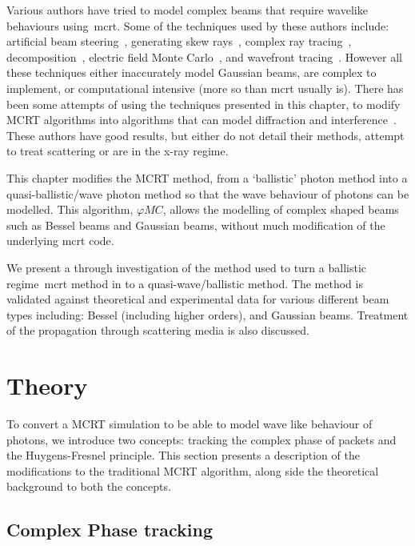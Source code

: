 Various authors have tried to model complex beams that require wavelike behaviours using~\gls*{mcrt}.
Some of the techniques used by these authors include: artificial beam steering~\cite{hokr2015modeling}, generating skew rays~\cite{arnaud1985representation}, complex ray tracing~\cite{harvey2015modeling}, decomposition~\cite{worku2018decomposition}, electric field Monte Carlo~\cite{cai2014electric}, and wavefront tracing~\cite{volpe2017huygens}.
However all these techniques either inaccurately model Gaussian beams, are complex to implement, or computational intensive (more so than \gls*{mcrt} usually is).
There has been some attempts of using the techniques presented in this chapter, to modify MCRT algorithms into algorithms that can model diffraction and interference~\cite{mignon2016fractional,peter2014combining,mahan2018monte,mout2016simulating,fischer2008monte}.
These authors have good results, but either do not detail their methods, attempt to treat scattering or are in the x-ray regime.


This chapter modifies the MCRT method, from a `ballistic' photon method into a quasi-ballistic/wave photon method so that the wave behaviour of photons can be modelled.
This algorithm, $\varphi MC$, allows the modelling of complex shaped beams such as Bessel beams and Gaussian beams, without much modification of the underlying \gls*{mcrt} code.

We present a through investigation of the method used to turn a ballistic regime~\gls*{mcrt} method in to a quasi-wave/ballistic method.
The method is validated against theoretical and experimental data for various different beam types including: Bessel (including higher orders), and Gaussian beams.
Treatment of the propagation through scattering media is also discussed.


\section{Theory}\label{sec:bestheory}

To convert a MCRT simulation to be able to model wave like behaviour of photons, we introduce two concepts: tracking the complex phase of packets and the Huygens-Fresnel principle.
This section presents a description of the modifications to the traditional MCRT algorithm, along side the theoretical background to both the concepts.

\subsection{Complex Phase tracking}

